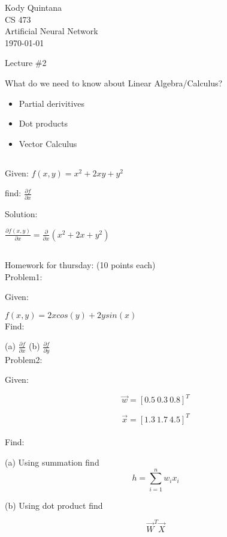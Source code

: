 \documentclass[14pt]{article}
\newcommand{\question}{\begin{tcolorbox}[boxrule=0.5pt, colback=backgrey, colframe=bordergrey, sharpish corners]\subsection{}}
\newcommand{\closequestion}{\end{tcolorbox}}
\begin{document}
\begin{flushleft}
 
\large
Kody Quintana\\
CS 473\\
Artificial Neural Network\\
\today\\
\boldmath

\begin{center}
Lecture \#2
\end{center}

What do we need to know about Linear Algebra/Calculus?
\begin{itemize}
\item Partial derivitives
\item Dot products
\item Vector Calculus
\end{itemize}


\question

Given:
$f(x,y) = x^2 + 2xy + y^2$

find: 
$\frac{\partial f}{\partial x}$
\closequestion

Solution:

$\frac
	{\partial f(x,y)}
	{\partial x}
= \frac
	{\partial}
	{\partial x}
(x^2 + 2x + y^2)
%
%
%
%
%
%
$

\question
Homework for thursday: (10 points each)
\\[2\baselineskip]

Problem1:

Given:

$
f(x,y) = 2x cos(y) + 2y sin(x)
$
\\[1\baselineskip]

Find:

(a)
$
\frac
	{\partial f}
	{\partial x}
$
(b)
$
\frac
	{\partial f}
	{\partial y}
$
\\[2\baselineskip]
Problem2:

Given:

$$
\vec{w} = [0.5\ 0.3\ 0.8]^T
$$

$$
\vec{x} = [1.3\ 1.7\ 4.5]^T
$$
\\[1\baselineskip]

Find:

(a) Using summation find 
$$
h=\sum_{i=1}^{n} w_i x_i
$$

(b)
Using dot product find

$$
\vec{W}^T \vec{X}
$$
\closequestion



\end{flushleft}
\end{document}
